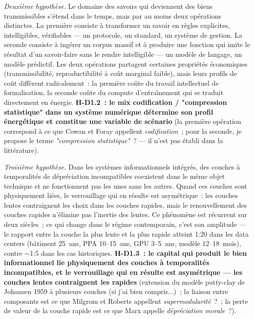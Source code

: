 \emph{Deuxi\`eme hypoth\`ese.} Le domaine des savoirs qui deviennent des biens transmissibles s'\'etend dans le temps, mais par au moins deux op\'erations distinctes. La premi\`ere consiste \`a transformer un savoir en r\`egles explicites, intelligibles, v\'erifiables --- un protocole, un standard, un syst\`eme de gestion. La seconde consiste \`a ing\'erer un corpus massif et \`a produire une fonction qui imite le r\'esultat d'un savoir-faire sans le rendre intelligible --- un mod\`ele de langage, un mod\`ele pr\'edictif. Les deux op\'erations partagent certaines propri\'et\'es \'economiques (transmissibilit\'e, reproductibilit\'e \`a co\^ut marginal faible), mais leurs profils de co\^ut diff\`erent radicalement~: la premi\`ere co\^ute du travail intellectuel de formalisation, la seconde co\^ute du compute d'entra\^{\i}nement qui se traduit directement en \'energie. \textbf{H-D1.2~: le mix codification / "compression statistique" dans un syst\`eme num\'erique d\'etermine son profil \'energ\'etique et constitue une variable de sc\'enario} (la premi\`ere op\'eration correspond \`a ce que Cowan et Foray appellent \emph{codification}~; pour la seconde, je propose le terme \emph{"compression statistique"}~? --- il n'est pas \'etabli dans la litt\'erature).

\emph{Troisi\`eme hypoth\`ese.} Dans les syst\`emes informationnels int\'egr\'es, des couches \`a temporalit\'es de d\'epr\'eciation incompatibles coexistent dans le m\^eme objet technique et ne fonctionnent pas les unes sans les autres. Quand ces couches sont physiquement li\'ees, le verrouillage qui en r\'esulte est asym\'etrique~: les couches lentes contraignent les choix dans les couches rapides, mais le renouvellement des couches rapides n'\'elimine pas l'inertie des lentes. Ce ph\'enom\`ene est r\'ecurrent sur deux si\`ecles~; ce qui change dans le r\'egime contemporain, c'est son amplitude --- le rapport entre la couche la plus lente et la plus rapide atteint 1:20 dans les data centers (b\^atiment 25~ans, PPA 10--15~ans, GPU 3--5~ans, mod\`ele 12--18~mois), contre $\sim$1:5 dans les cas historiques. \textbf{H-D1.3~: le capital qui produit le bien informationnel lie physiquement des couches \`a temporalit\'es incompatibles, et le verrouillage qui en r\'esulte est asym\'etrique --- les couches lentes contraignent les rapides} (extension du mod\`ele putty-clay de Johansen 1959 \`a plusieurs couches (si j'ai bien compris...)~; la liaison entre composants est ce que Milgrom et Roberts appellent \emph{supermodularit\'e}~?~; la perte de valeur de la couche rapide est ce que Marx appelle \emph{d\'epr\'eciation morale}~?).

